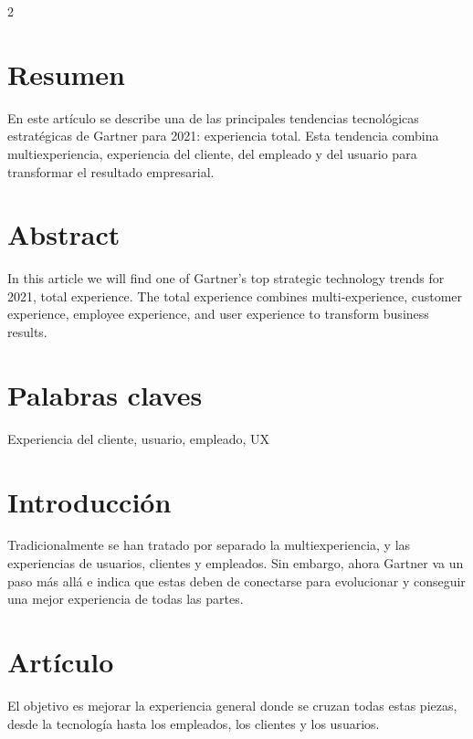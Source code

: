 \documentclass[12pt,spanish,Letterpaper,openany]{book}
\begin{document}
\begin {multicols}{2}

\hypertarget{resumen-3}{%
\section{Resumen}\label{resumen-3}}

En este artículo se describe una de las principales tendencias tecnológicas estratégicas de Gartner para 2021: experiencia total. Esta tendencia combina multiexperiencia, experiencia del cliente, del empleado y del usuario para transformar el resultado empresarial.

\hypertarget{abstract-3}{%
\section{Abstract}\label{abstract-3}}

In this article we will find one of Gartner's top strategic technology trends for 2021, total experience. The total experience combines multi-experience, customer experience, employee experience, and user experience to transform business results.

\hypertarget{palabras-claves-3}{%
\section{Palabras claves}\label{palabras-claves-3}}

Experiencia del cliente, usuario, empleado, UX

\hypertarget{introducciuxf3n-3}{%
\section{Introducción}\label{introducciuxf3n-3}}

Tradicionalmente se han tratado por separado la multiexperiencia, y las experiencias de usuarios, clientes y empleados. Sin embargo, ahora Gartner va un paso más allá e indica que estas deben de conectarse para evolucionar y conseguir una mejor experiencia de todas las partes.

\hypertarget{artuxedculo-3}{%
\section{Artículo}\label{artuxedculo-3}}

El objetivo es mejorar la experiencia general donde se cruzan todas estas piezas, desde la tecnología hasta los empleados, los clientes y los usuarios.


\end{multicols}
\end{document}
